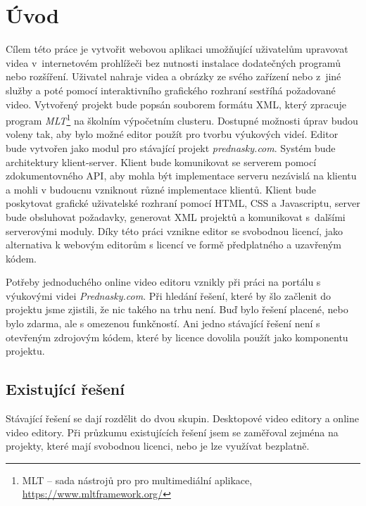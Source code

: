 \chapter{Úvod}
Cílem této práce je vytvořit webovou aplikaci umožňující uživatelům upravovat videa v~internetovém prohlížeči bez nutnosti instalace dodatečných programů nebo rozšíření. Uživatel nahraje videa a obrázky ze svého zařízení nebo z~jiné služby a poté pomocí interaktivního grafického rozhraní sestříhá požadované video. Vytvořený projekt bude popsán souborem formátu XML, který zpracuje program \textit{MLT}\footnote{MLT -- sada nástrojů pro pro multimediální aplikace, \url{https://www.mltframework.org/}} na školním výpočetním clusteru. Dostupné možnosti úprav budou voleny tak, aby bylo možné editor použít pro tvorbu výukových videí. Editor bude vytvořen jako modul pro stávající projekt \textit{prednasky.com}.
Systém bude architektury klient-server. Klient bude komunikovat se serverem pomocí zdokumentovného API, aby mohla být implementace serveru nezávislá na klientu a mohli v budoucnu vzniknout různé implementace klientů. Klient bude poskytovat grafické uživatelské rozhraní pomocí HTML, CSS a Javascriptu, server bude obsluhovat požadavky, generovat XML projektů a komunikovat s~dalšími serverovými moduly. Díky této práci vznikne editor se svobodnou licencí, jako alternativa k webovým editorům s licencí ve formě předplatného a uzavřeným kódem.

Potřeby jednoduchého online video editoru vznikly při práci na portálu s výukovými videi \textit{Prednasky.com}. Při hledání řešení, které by šlo začlenit do projektu jsme zjistili, že nic takého na trhu není. Buď bylo řešení placené, nebo bylo zdarma, ale s omezenou funkčností. Ani jedno stávající řešení není s otevřeným zdrojovým kódem, které by licence dovolila použít jako komponentu projektu.

\section{Existující řešení}
Stávající řešení se dají rozdělit do dvou skupin. Desktopové video editory a online video editory. Při průzkumu existujících řešení jsem se zaměřoval zejména na projekty, které mají svobodnou licenci, nebo je lze využívat bezplatně.

